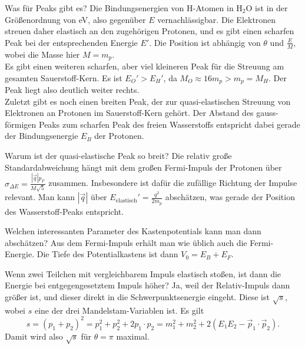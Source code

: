 \begin{fquestion}{Was für Peaks gibt es?}
    Die Bindungsenergien von H-Atomen in $\mathrm{H}_2 \mathrm{O}$ ist in der Größenordnung von eV, also gegenüber $E$ vernachlässigbar. 
    Die Elektronen streuen daher elastisch an den zugehörigen Protonen, und es gibt einen scharfen Peak bei der entsprechenden Energie $E'$. 
    Die Position ist abhängig von $\theta$ und $\frac{E}{M}$, wobei die Masse hier $M=m_p$.
    \\
    Es gibt einen weiteren scharfen, aber viel kleineren Peak für die Streuung am gesamten Sauerstoff-Kern. 
    Es ist $E_O' > E_H'$, da $M_O \approx 16m_p > m_p = M_H$.
    Der Peak liegt also deutlich weiter rechts.
    \\
    Zuletzt gibt es noch einen breiten Peak, der zur quasi-elastischen Streuung von Elektronen an Protonen im Sauerstoff-Kern gehört.
    Der Abstand des gauss-förmigen Peaks zum scharfen Peak des freien Wasserstoffs entspricht dabei gerade der Bindungsenergie $E_B$ der Protonen.
\end{fquestion}

\begin{fquestion}{Warum ist der quasi-elastische Peak so breit?}
    Die relativ große Standardabweichung hängt mit dem großen Fermi-Impuls der Protonen über $\sigma_{\Delta E} = \frac{|\Vec{q}| p_F}{ M\sqrt{5}}$ zusammen.
    Insbesondere ist dafür die zufällige Richtung der Impulse relevant.
    Man kann $|\Vec{q}|$ über $E_\mathrm{elastisch}' = \frac{q^2}{2m_p}$ abschätzen, was gerade der Position des Wasserstoff-Peaks entspricht.
\end{fquestion}

\begin{fquestion}{Welchen interessanten Parameter des Kastenpotentials kann man dann abschätzen?}
    Aus dem Fermi-Impuls erhält man wie üblich auch die Fermi-Energie.
    Die Tiefe des Potentialkastens ist dann $V_0 = E_B + E_F$.
\end{fquestion}


\begin{fquestion}{Wenn zwei Teilchen mit vergleichbarem Impuls elastisch stoßen, ist dann die Energie bei entgegengesetztem Impuls höher?}
    Ja, weil der Relativ-Impuls dann größer ist, und dieser direkt in die Schwerpunktsenergie eingeht.
    Diese ist $\sqrt{s}$, wobei $s$ eine der drei Mandelstam-Variablen ist.
    Es gilt
    $$s = (p_1 + p_2)^2 = p_1^2 + p_2^2 + 2p_1\cdot p_2 = m_1^2 + m_2^2 + 2(E_1E_2 - \Vec{p}_1\cdot\Vec{p}_2).$$
    Damit wird also $\sqrt{s}$ für $\theta = \pi$ maximal.
\end{fquestion}

